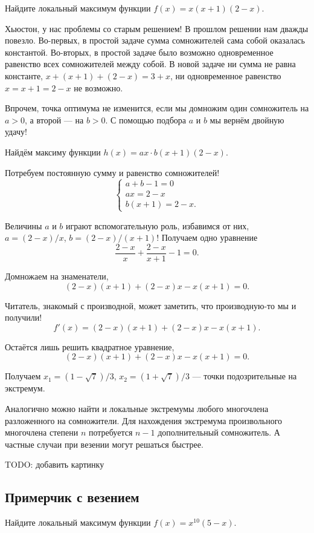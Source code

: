 \documentclass[12pt]{article}
\begin{document}
Найдите локальный максимум функции $f(x) = x (x + 1) (2 - x)$.


Хьюстон, у нас проблемы со старым решением!
В прошлом решении нам дважды повезло.
Во-первых, в простой задаче сумма сомножителей сама собой оказалась константой.
Во-вторых, в простой задаче было возможно одновременное равенство всех сомножителей между собой. 
В новой задаче ни сумма не равна константе, $x + (x + 1) + (2 - x) = 3 +x$, ни одновременное равенство $x = x+1 = 2-x$ не возможно.

Впрочем, точка оптимума не изменится, если мы домножим один сомножитель на $a > 0$, а второй — на $b > 0$.
С помощью подбора $a$ и $b$ мы вернём двойную удачу!

Найдём максиму функции $h(x) = ax \cdot b(x + 1) (2 - x)$.

Потребуем постоянную сумму и равенство сомножителей!
\[
\begin{cases}
    a + b - 1 = 0 \\
    ax = 2 - x \\
    b(x + 1) = 2 - x.
\end{cases}
\]

Величины $a$ и $b$ играют вспомогательную роль, избавимся от них, $a = (2 - x)/x$, $b = (2 - x)/(x + 1)$!
Получаем одно уравнение 
\[
\frac{2 - x}{x} + \frac{2 - x}{x + 1} - 1 = 0.
\]

Домножаем на знаменатели,
\[
(2 - x)(x + 1) + (2 - x) x - x (x + 1) = 0.
\]

Читатель, знакомый с производной, может заметить, что производную-то мы и получили!
\[
f'(x) = (2 - x)(x + 1) + (2 - x) x - x (x + 1).
\]

Остаётся лишь решить квадратное уравнение,
\[
(2 - x)(x + 1) + (2 - x) x - x (x + 1) = 0.
\]

Получаем $x_1 = (1 - \sqrt{7}) / 3$, $x_2 = (1 + \sqrt{7}) / 3$ — точки подозрительные на экстремум.


Аналогично можно найти и локальные экстремумы любого многочлена разложенного на сомножители. 
Для нахождения экстремума произвольного многочлена степени $n$ потребуется $n - 1$ дополнительный сомножитель. 
А частные случаи при везении могут решаться быстрее. 

TODO: добавить картинку


\subsection*{Примерчик с везением}

Найдите локальный максимум функции $f(x) = x^{10} (5 - x)$.
\end{document}
